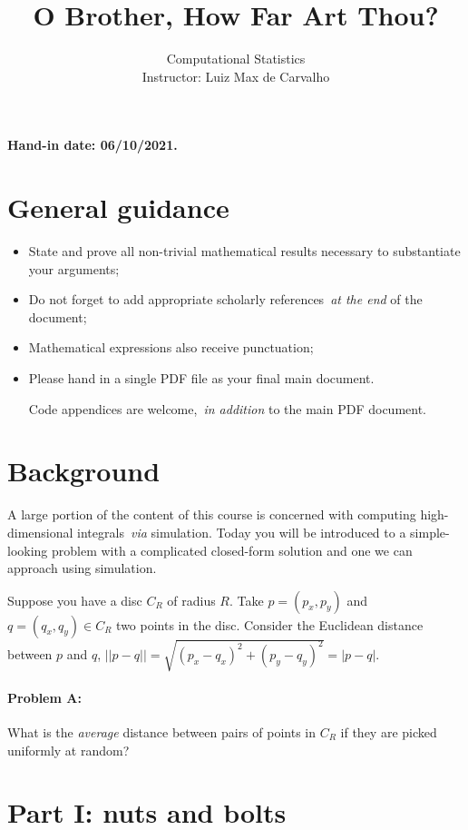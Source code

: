 \documentclass[a4paper,10pt, notitlepage]{report}
\title{O Brother, How Far Art Thou?}
\author{Computational Statistics \\ Instructor: Luiz Max de Carvalho}
\begin{document}
\maketitle

\textbf{Hand-in date: 06/10/2021.}

\section*{General guidance}
\begin{itemize}
 \item State and prove all non-trivial mathematical results necessary to substantiate your arguments;
 \item Do not forget to add appropriate scholarly references~\textit{at the end} of the document;
 \item Mathematical expressions also receive punctuation;
 \item Please hand in a single PDF file as your final main document.
 
 Code appendices are welcome,~\textit{in addition} to the main PDF document.
 \end{itemize}

\newpage

\section*{Background}

A large portion of the content of this course is concerned with computing high-dimensional integrals~\textit{via} simulation.
Today you will be introduced to a simple-looking problem with a complicated closed-form solution and one we can approach using simulation.

Suppose you have a disc $C_R$ of radius $R$. 
Take $p = (p_x, p_y)$ and $ q = (q_x, q_y) \in C_R$ two points in the disc.  
Consider the Euclidean distance between $p$  and $q$, $||p-q|| = \sqrt{(p_x-q_x)^2 + (p_y-q_y)^2} = |p-q|$.
\paragraph{Problem A:} What is the \textit{average} distance between pairs of points in $C_R$ if they are picked uniformly at random?

\section*{Part I: nuts and bolts}
\end{document}
